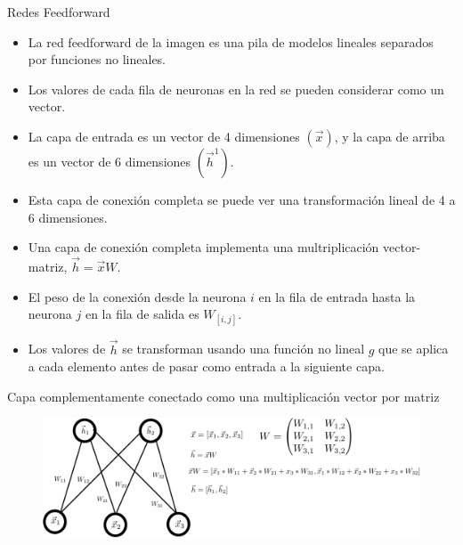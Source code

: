 \documentclass[handout]{beamer}
\begin{document}
\begin{frame}{Redes Feedforward}
\begin{scriptsize}
\begin{itemize}
\item La red feedforward de la imagen es una pila de modelos lineales separados por funciones no lineales.
\item Los valores de cada fila de neuronas en la red se pueden considerar como un vector. 

\item La capa de entrada es un vector de 4 dimensiones $(\vec{x})$, y la capa de arriba es un vector de 6 dimensiones $(\vec{h}^1)$.


\item Esta capa de conexión completa se puede ver una transformación lineal de 4 a 6 dimensiones.
\item Una capa de conexión completa implementa una multriplicación vector-matriz, $\vec{h}=\vec{x}W$.
\item El peso de la conexión desde la neurona $i$ en la fila de entrada hasta la neurona $j$ en la fila de salida es $W_{[i, j]}$.
\item Los valores de $\vec{h}$ se transforman usando una función no lineal $g$ que se aplica a cada elemento antes de pasar como entrada a la siguiente capa.
\end{itemize}



\end{scriptsize}
\end{frame}


\begin{frame}{Capa complementamente conectado como una multiplicación vector por matriz}
\begin{figure}[htb]
	\centering
	 \includegraphics[scale=0.65]{imagenes/neural_net_mat_mul.pdf}
\end{figure}
\end{frame}
\end{document}
